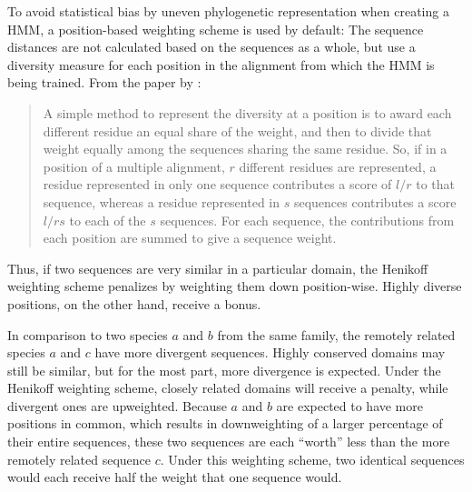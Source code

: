 To avoid statistical bias by uneven phylogenetic representation when creating a
HMM, a position-based weighting scheme \citep{henikoff1994} is used by default:
The sequence distances are not calculated based on the sequences as a whole, but
use a diversity measure for each position in the alignment from which the HMM is
being trained. From the paper by \citet{henikoff1994}:

\begin{quote}
	A simple method to represent the diversity at a position is to award each
	different residue an equal share of the weight, and then to divide that weight
	equally among the sequences sharing the same residue. So, if in a position of
	a multiple alignment, $r$ different residues are represented, a residue
	represented in only one sequence contributes a score of $l/r$ to that
	sequence, whereas a residue represented in $s$ sequences contributes a score
	$l/rs$ to each of the $s$ sequences. For each sequence, the contributions from
	each position are summed to give a sequence weight.
\end{quote}

Thus, if two sequences are very similar in a particular domain, the Henikoff
weighting scheme penalizes by weighting them down position-wise. Highly diverse
positions, on the other hand, receive a bonus. 

In comparison to two species $a$ and $b$ from the same family, the remotely
related species $a$ and $c$ have more divergent sequences. Highly conserved
domains may still be similar, but for the most part, more divergence is
expected. Under the Henikoff weighting scheme, closely related domains will
receive a penalty, while divergent ones are upweighted. Because $a$ and $b$ are
expected to have more positions in common, which results in downweighting of a
larger percentage of their entire sequences, these two sequences are each
``worth'' less than the more remotely related sequence $c$. Under this weighting
scheme, two identical sequences would each receive half the weight that one
sequence would.



